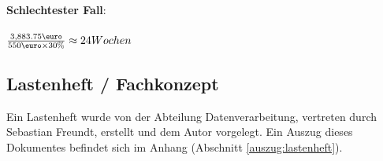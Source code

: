 \textbf{Schlechtester Fall}:\\
\\
$\frac{3,883.75\text{\euro}}{550\text{\euro} \times 30\text{\%}} \approx 24 Wochen$
\\

\subsection{Lastenheft / Fachkonzept}
Ein Lastenheft wurde von der Abteilung Datenverarbeitung, vertreten durch Sebastian Freundt,
erstellt und dem Autor vorgelegt. Ein Auszug dieses Dokumentes befindet sich im Anhang  (Abschnitt \ref{auszug:lastenheft}).\par

